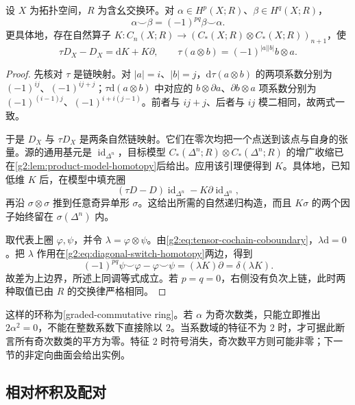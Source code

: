\begin{proposition}\label{g2:prop:graded-commutativity}
	设 \(X\) 为拓扑空间，\(R\) 为含幺交换环。对 \(\alpha\in H^p(X;R)\)、\(\beta\in H^q(X;R)\)，
	\[
		\alpha\smile\beta=(-1)^{pq}\beta\smile\alpha.
	\]
	更具体地，存在自然算子 \(K:C_n(X;R)\to(C_*(X;R)\otimes C_*(X;R))_{n+1}\)，使
	\begin{equation}\label{g2:eq:diagonal-switch-homotopy}
		\tau D_X-D_X=\mathrm{d}K+K\partial,
		\qquad
		\tau(a\otimes b)=(-1)^{|a||b|}b\otimes a.
	\end{equation}
\end{proposition}
\begin{proof}
	先核对 \(\tau\) 是链映射。对 \(|a|=i\)、\(|b|=j\)，\(\mathrm{d}\tau(a\otimes b)\) 的两项系数分别为 \((-1)^{ij}\)、\((-1)^{ij+j}\)；\(\tau\mathrm{d}(a\otimes b)\) 中对应的 \(b\otimes\partial a\)、\(\partial b\otimes a\) 项系数分别为 \((-1)^{(i-1)j}\)、\((-1)^{i+i(j-1)}\)。前者与 \(ij+j\)、后者与 \(ij\) 模二相同，故两式一致。

	于是 \(D_X\) 与 \(\tau D_X\) 是两条自然链映射。它们在零次均把一个点送到该点与自身的张量。源的通用基元是 \(\operatorname{id}_{\Delta^n}\)，目标模型 \(C_*(\Delta^n;R)\otimes C_*(\Delta^n;R)\) 的增广收缩已在\cref{g2:lem:product-model-homotopy}后给出。应用该引理便得到 \(K\)。具体地，已知低维 \(K\) 后，在模型中填充圈
	\[
		(\tau D-D)\operatorname{id}_{\Delta^n}
			-K\partial\operatorname{id}_{\Delta^n},
	\]
	再沿 \(\sigma\otimes\sigma\) 推到任意奇异单形 \(\sigma\)。这给出所需的自然递归构造，而且 \(K\sigma\) 的两个因子始终留在 \(\sigma(\Delta^n)\) 内。

	取代表上圈 \(\varphi,\psi\)，并令 \(\lambda=\varphi\otimes\psi\)。由\eqref{g2:eq:tensor-cochain-coboundary}，\(\lambda\mathrm{d}=0\)。把 \(\lambda\) 作用在\eqref{g2:eq:diagonal-switch-homotopy}两边，得到
	\[
		(-1)^{pq}\psi\smile\varphi-\varphi\smile\psi
		=(\lambda K)\partial=\delta(\lambda K).
	\]
	故差为上边界，所述上同调等式成立。若 \(p=q=0\)，右侧没有负次上链，此时两种取值已由 \(R\) 的交换律严格相同。
\end{proof}

这样的环称为[graded-commutative ring]。若 \(\alpha\) 为奇次数类，只能立即推出 \(2\alpha^2=0\)，不能在整数系数下直接除以 \(2\)。当系数域的特征不为 \(2\) 时，才可据此断言所有奇次数类的平方为零。特征 \(2\) 时符号消失，奇次数平方则可能非零；下一节的非定向曲面会给出实例。

\subsection{相对杯积及配对}
\label{g2:subsec:0404:04}

